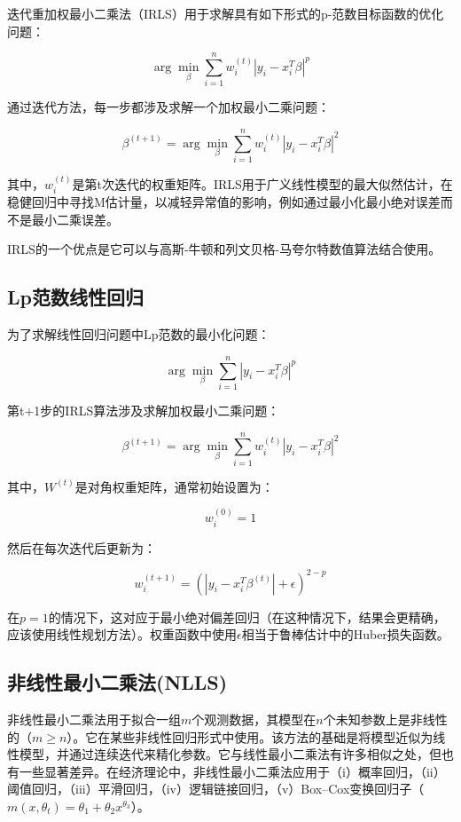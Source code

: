 \documentclass{ctexart}
\begin{document}
迭代重加权最小二乘法（IRLS）用于求解具有如下形式的p-范数目标函数的优化问题：

\[
	\arg\min_{\beta} \sum_{i=1}^{n} w_i^{(t)} |y_i - x_i^T \beta|^p
\]

通过迭代方法，每一步都涉及求解一个加权最小二乘问题：

\[
	\beta^{(t+1)} = \arg\min_{\beta} \sum_{i=1}^{n} w_i^{(t)} |y_i - x_i^T \beta|^2
\]

其中，$w_i^{(t)}$是第t次迭代的权重矩阵。IRLS用于广义线性模型的最大似然估计，在稳健回归中寻找M估计量，以减轻异常值的影响，例如通过最小化最小绝对误差而不是最小二乘误差。

IRLS的一个优点是它可以与高斯-牛顿和列文贝格-马夸尔特数值算法结合使用。

\subsection{Lp范数线性回归}

为了求解线性回归问题中Lp范数的最小化问题：

\[
	\arg\min_{\beta} \sum_{i=1}^{n} |y_i - x_i^T \beta|^p
\]

第t+1步的IRLS算法涉及求解加权最小二乘问题：

\[
	\beta^{(t+1)} = \arg\min_{\beta} \sum_{i=1}^{n} w_i^{(t)} |y_i - x_i^T \beta|^2
\]

其中，$W^{(t)}$是对角权重矩阵，通常初始设置为：

\[
	w_i^{(0)} = 1
\]

然后在每次迭代后更新为：

\[
	w_i^{(t+1)} = \left( |y_i - x_i^T \beta^{(t)}| + \epsilon \right)^{2-p}
\]

在$p=1$的情况下，这对应于最小绝对偏差回归（在这种情况下，结果会更精确，应该使用线性规划方法）。权重函数中使用$\epsilon$相当于鲁棒估计中的Huber损失函数。




\subsection{非线性最小二乘法(NLLS)}


非线性最小二乘法用于拟合一组$m$个观测数据，其模型在$n$个未知参数上是非线性的（$m \geq n$）。它在某些非线性回归形式中使用。该方法的基础是将模型近似为线性模型，并通过连续迭代来精化参数。它与线性最小二乘法有许多相似之处，但也有一些显著差异。在经济理论中，非线性最小二乘法应用于（i）概率回归，（ii）阈值回归，（iii）平滑回归，（iv）逻辑链接回归，（v）Box–Cox变换回归子（$m(x, \theta_t) = \theta_1 + \theta_2 x^{\theta_3}$）。
\end{document}
